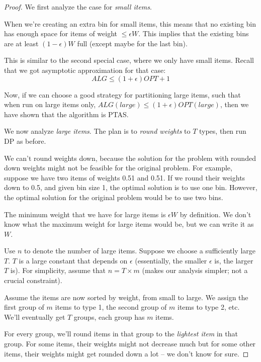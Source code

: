 \documentclass{article}
\begin{document}
\begin{proof}
	
	We first analyze the case for \textit{small items}. 

	When we're creating an extra bin for small items, this means that no existing bin has enough space for items of weight $\leq \epsilon W$. This implies that the existing bins are at least $(1-\epsilon) W$ full (except maybe for the last bin). 

	This is similar to the second special case, where we only have small items. Recall that we got asymptotic approximation for that case: 
	\[
		ALG \leq (1+\epsilon) OPT + 1
	\] 

	Now, if we can choose a good strategy for partitioning large items, such that when run on large items only, $ALG (large) \leq (1+\epsilon) OPT (large)$, then we have shown that the algorithm is PTAS. 

	We now analyze \textit{large items}. The plan is to \textit{round weights} to $T$ types, then run DP as before. 


	We can't round weights down, because the solution for the problem with rounded down weights might not be feasible for the original problem. For example, suppose we have two items of weights 0.51 and 0.51. If we round their weights down to 0.5, and given bin size 1, the optimal solution is to use one bin. However, the optimal solution for the original problem would be to use two bins.  

	The minimum weight that we have for large items is $\epsilon W$ by definition. We don't know what the maximum weight for large items would be, but we can write it as $W$. 

	Use $n$ to denote the number of large items. Suppose we choose a sufficiently large $T$. $T$ is a large constant that depends on $\epsilon$ (essentially, the smaller $\epsilon$ is, the larger $T$ is). For simplicity, assume that $n = T \times m$ (makes our analysis simpler; not a crucial constraint).   

	Assume the items are now sorted by weight, from small to large. We assign the first group of $m$ items to type 1, the second group of $m$ items to type 2, etc. We'll eventually get $T$ groups, each group has $m$ items. 

	For every group, we'll round items in that group to the \textit{lightest item} in that group. For some items, their weights might not decrease much but for some other items, their weights might get rounded down a lot -- we don't know for sure.


\end{proof}
\end{document}
